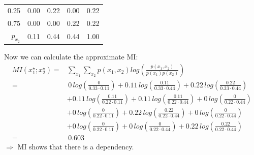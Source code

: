 {\begin{enumerate}[a)]
\begin{table}[H]
\begin{tabular}{r|rrr|r}
  		0.25 & 0.00 & 0.22 & 0.00 & 0.22 \\ 
  		0.75 & 0.00 & 0.00 & 0.22 & 0.22 \\
  		\hline 
  		$p_{x_2}$& 0.11 & 0.44 & 0.44 & 1.00 \\ 
  		\hline
  	\end{tabular}
  \end{table}
Now we can calculate the approximate MI: 
   \begin{align*}
   	MI(x_1^\star ; x_2^\star) = & \sum_{x_1} \sum_{x_2} p(x_1, x_2) log\left(\frac{p(x_1, x_2)}{p(x_1) p(x_2)} \right)\\
 	=& \,0\, log\left(\frac{0}{0.33 \cdot 0.11} \right) 
   	+ 0.11\, log\left(\frac{0.11}{0.33 \cdot 0.44} \right) 
   	+ 0.22\, log\left(\frac{0.22}{0.33 \cdot 0.44} \right) \\
   	&+ 0.11\, log\left(\frac{0.11}{0.22 \cdot 0.11} \right)
   	+ 0.11\, log\left(\frac{0.11}{0.22 \cdot 0.44} \right) 
   	+ 0\, log\left(\frac{0}{0.22 \cdot 0.44} \right) \\
   	&+ 0\, log\left(\frac{0}{0.22 \cdot 0.11} \right)
   	+ 0.22\, log\left(\frac{0.22}{0.22 \cdot 0.44} \right) 
   	+ 0\, log\left(\frac{0}{0.22 \cdot 0.44} \right) \\
   	&+ 0\, log\left(\frac{0}{0.22 \cdot 0.11} \right)
   	+ 0\, log\left(\frac{0}{0.22 \cdot 0.44} \right) 
   	+ 0.22\, log\left(\frac{0.22}{0.22 \cdot 0.44} \right) \\
   	= & \, 0.603
   \end{align*}
$\Rightarrow$ MI shows that there is a dependency.
  
 
  
\end{enumerate}
}